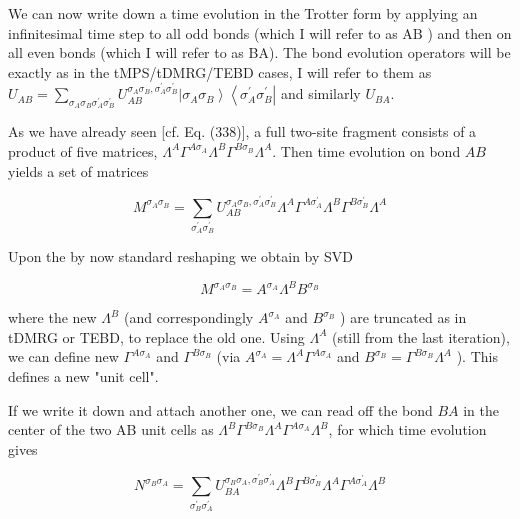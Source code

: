 \documentclass[12pt]{article}
\begin{document}
We can now write down a time evolution in the Trotter form by applying an infinitesimal time step to all odd bonds (which I will refer to as $\mathrm{AB}$ ) and then on all even bonds (which I will refer to as BA). The bond evolution operators will be exactly as in the tMPS/tDMRG/TEBD cases, I will refer to them as $U_{A B}=\sum_{\sigma_{A} \sigma_{B} \sigma_{A}^{\prime} \sigma_{B}^{\prime}} U_{A B}^{\sigma_{A} \sigma_{B}, \sigma_{A}^{\prime} \sigma_{B}^{\prime}}\left|\sigma_{A} \sigma_{B}\right\rangle\left\langle\sigma_{A}^{\prime} \sigma_{B}^{\prime}\right|$ and similarly $U_{B A}$.

As we have already seen [cf. Eq. (338)], a full two-site fragment consists of a product of five matrices, $\Lambda^{A} \Gamma^{A \sigma_{A}} \Lambda^{B} \Gamma^{B \sigma_{B}} \Lambda^{A}$. Then time evolution on bond $A B$ yields a set of matrices


\begin{equation*}
M^{\sigma_{A} \sigma_{B}}=\sum_{\sigma_{A}^{\prime} \sigma_{B}^{\prime}} U_{A B}^{\sigma_{A} \sigma_{B}, \sigma_{A}^{\prime} \sigma_{B}^{\prime}} \Lambda^{A} \Gamma^{A \sigma_{A}^{\prime}} \Lambda^{B} \Gamma^{B \sigma_{B}^{\prime}} \Lambda^{A} \tag{345}
\end{equation*}


Upon the by now standard reshaping we obtain by SVD


\begin{equation*}
M^{\sigma_{A} \sigma_{B}}=A^{\sigma_{A}} \Lambda^{B} B^{\sigma_{B}} \tag{346}
\end{equation*}


where the new $\Lambda^{B}$ (and correspondingly $A^{\sigma_{A}}$ and $B^{\sigma_{B}}$ ) are truncated as in tDMRG or TEBD, to replace the old one. Using $\Lambda^{A}$ (still from the last iteration), we can define new $\Gamma^{A \sigma_{A}}$ and $\Gamma^{B \sigma_{B}}$ (via $A^{\sigma_{A}}=\Lambda^{A} \Gamma^{A \sigma_{A}}$ and $B^{\sigma_{B}}=\Gamma^{B \sigma_{B}} \Lambda^{A}$ ). This defines a new "unit cell".

If we write it down and attach another one, we can read off the bond $B A$ in the center of the two AB unit cells as $\Lambda^{B} \Gamma^{B \sigma_{B}} \Lambda^{A} \Gamma^{A \sigma_{A}} \Lambda^{B}$, for which time evolution gives


\begin{equation*}
N^{\sigma_{B} \sigma_{A}}=\sum_{\sigma_{B}^{\prime} \sigma_{A}^{\prime}} U_{B A}^{\sigma_{B} \sigma_{A}, \sigma_{B}^{\prime} \sigma_{A}^{\prime}} \Lambda^{B} \Gamma^{B \sigma_{B}^{\prime}} \Lambda^{A} \Gamma^{A \sigma_{A}^{\prime}} \Lambda^{B} \tag{347}
\end{equation*}
\end{document}
